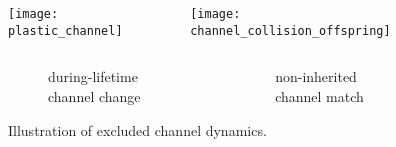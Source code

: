 \begin{figure}
\begin{columns}
  \begin{column}{0.5\textwidth}
\colorbox{extralightgray}{\hspace{0.136\textwidth}\texttt{[image: plastic\_channel]}\hspace{0.136\textwidth}}
  \end{column}%
  \begin{column}{0.5\textwidth}%
\colorbox{extralightgray}{\texttt{[image: channel\_collision\_offspring]}}
  \end{column}
\end{columns}%
\begin{columns}
  \begin{column}{0.5\textwidth}
    \begin{subfigure}[b]{\textwidth}
    \caption{during-lifetime channel change}
    \end{subfigure}
  \end{column}
  \begin{column}{0.5\textwidth}
    \begin{subfigure}[b]{\textwidth}
    \caption{non-inherited channel match\footnotemark}
    \end{subfigure}
  \end{column}
\end{columns}
\caption{Illustration of excluded channel dynamics.}
\end{figure}
